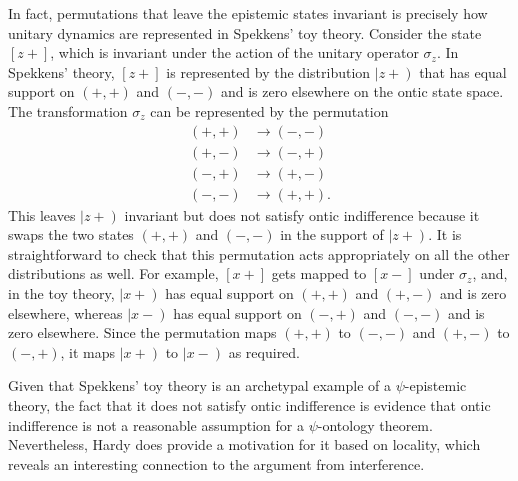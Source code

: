 \documentclass[DIV=calc,paper=a4,fontsize=11pt,twocolumn]{scrartcl} %
\theoremstyle{definition}
\theoremstyle{plain}
\newcommand{\RKet}[1]{\ensuremath{\left \vert #1 \right )}}
\newcommand{\Proj}[1]{\ensuremath{\left [ #1 \right ]}}
\begin{document}
In fact, permutations that leave the epistemic states invariant is
precisely how unitary dynamics are represented in Spekkens' toy
theory.  Consider the state $\Proj{z+}$, which is invariant under the
action of the unitary operator $\sigma_z$.  In Spekkens' theory,
$\Proj{z+}$ is represented by the distribution $\RKet{z+}$ that has
equal support on $(+,+)$ and $(-,-)$ and is zero elsewhere on the
ontic state space.  The transformation $\sigma_z$ can be represented
by the permutation
\begin{align}
(+,+) & \rightarrow (-,-) \\
(+,-) & \rightarrow (-,+) \\
(-,+) & \rightarrow (+,-) \\
(-,-) & \rightarrow (+,+).
\end{align}
This leaves $\RKet{z+}$ invariant but does not satisfy ontic
indifference because it swaps the two states $(+,+)$ and $(-,-)$ in
the support of $\RKet{z+}$.  It is straightforward to check that this
permutation acts appropriately on all the other distributions as well.
For example, $\Proj{x+}$ gets mapped to $\Proj{x-}$ under $\sigma_z$,
and, in the toy theory, $\RKet{x+}$ has equal support on $(+,+)$ and
$(+,-)$ and is zero elsewhere, whereas $\RKet{x-}$ has equal support
on $(-,+)$ and $(-,-)$ and is zero elsewhere.  Since the permutation
maps $(+,+)$ to $(-,-)$ and $(+,-)$ to $(-,+)$, it maps $\RKet{x+}$ to
$\RKet{x-}$ as required.

Given that Spekkens' toy theory is an archetypal example of a
$\psi$-epistemic theory, the fact that it does not satisfy ontic
indifference is evidence that ontic indifference is not a reasonable
assumption for a $\psi$-ontology theorem.  Nevertheless, Hardy does
provide a motivation for it based on locality, which reveals an
interesting connection to the argument from interference.
\end{document}
